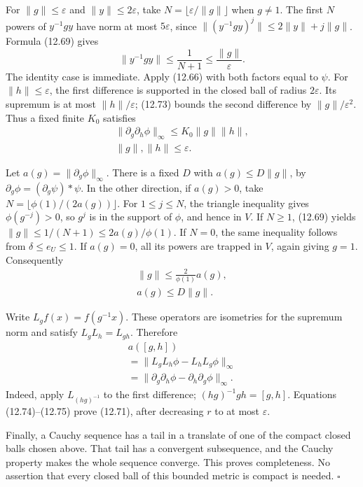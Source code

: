 \documentclass[
  11pt,
]{article}
\begin{document}
For \(\|g\|\leq\varepsilon\) and \(\|y\|\leq2\varepsilon\), take
\(N=\lfloor\varepsilon/\|g\|\rfloor\) when \(g\ne1\). The first \(N\)
powers of \(y^{-1}gy\) have norm at most \(5\varepsilon\), since
\(\|(y^{-1}gy)^j\|\leq2\|y\|+j\|g\|\). Formula (12.69) gives \[
\|y^{-1}gy\|\leq\frac1{N+1}
\leq\frac{\|g\|}{\varepsilon}.
\tag{12.73}
\] The identity case is immediate. Apply (12.66) with both factors equal
to \(\psi\). For \(\|h\|\leq\varepsilon\), the first difference is
supported in the closed ball of radius \(2\varepsilon\). Its supremum is
at most \(\|h\|/\varepsilon\); (12.73) bounds the second difference by
\(\|g\|/\varepsilon^2\). Thus a fixed finite \(K_0\) satisfies \[
\begin{gathered}
\|\partial_g\partial_h\phi\|_\infty
\leq K_0\|g\|\|h\|,\\
\|g\|,\|h\|\leq\varepsilon.
\end{gathered}
\tag{12.74}
\]

Let \(a(g)=\|\partial_g\phi\|_\infty\). There is a fixed \(D\) with
\(a(g)\leq D\|g\|\), by \(\partial_g\phi=(\partial_g\psi)*\psi\). In the
other direction, if \(a(g)>0\), take
\(N=\lfloor\phi(1)/(2a(g))\rfloor\). For \(1\leq j\leq N\), the triangle
inequality gives \(\phi(g^{-j})>0\), so \(g^j\) is in the support of
\(\phi\), and hence in \(V\). If \(N\geq1\), (12.69) yields
\(\|g\|\leq1/(N+1)\leq2a(g)/\phi(1)\). If \(N=0\), the same inequality
follows from \(\delta\leq e_U\leq1\). If \(a(g)=0\), all its powers are
trapped in \(V\), again giving \(g=1\). Consequently \[
\begin{gathered}
\|g\|\leq\frac{2}{\phi(1)}a(g),\\
a(g)\leq D\|g\|.
\end{gathered}
\tag{12.75}
\]

Write \(L_gf(x)=f(g^{-1}x)\). These operators are isometries for the
supremum norm and satisfy \(L_gL_h=L_{gh}\). Therefore \[
\begin{gathered}
a([g,h])\\
=\|L_gL_h\phi-L_hL_g\phi\|_\infty\\
=\|\partial_g\partial_h\phi
       -\partial_h\partial_g\phi\|_\infty.
\end{gathered}
\tag{12.76}
\] Indeed, apply \(L_{(hg)^{-1}}\) to the first difference;
\((hg)^{-1}gh=[g,h]\). Equations (12.74)--(12.75) prove (12.71), after
decreasing \(r\) to at most \(\varepsilon\).

Finally, a Cauchy sequence has a tail in a translate of one of the
compact closed balls chosen above. That tail has a convergent
subsequence, and the Cauchy property makes the whole sequence converge.
This proves completeness. No assertion that every closed ball of this
bounded metric is compact is needed. \(\square\)
\end{document}
